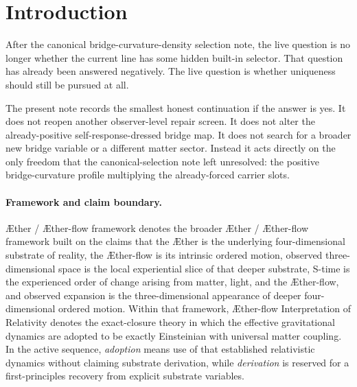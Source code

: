 \documentclass[11pt]{article}
\newcommand{\Aether}{\AE{}ther}
\newcommand{\Aflow}{\AE{}ther-flow}
\newcommand{\TheoryName}{\Aflow{} Interpretation of Relativity}
\newcommand{\TheoryProgram}{\Aether{} / \Aflow{} framework}
\newcommand{\CurvScale}{\ell_{\mathrm{br}}}
\newcommand{\CurvProfileCan}{F_{\mathrm{br}}^{\mathrm{can}}}
\begin{document}
\begin{abstract}
Because the downstream package is already profile-blind, substituting \(\CurvProfileCan\) back into the explicit local bridge-curvature density preserves the same reduced current, Hamiltonian-charge flux, continuity/Gauss-Poisson package, exterior Coulomb tail, surviving dressed bridge map, and explicit \(r^{-2}\) gain package as before. The claim boundary is strict: this note does not derive the new selector from the old local action, does not reopen observer-level repair work, and does not yet derive the response scale \(\CurvScale\) from deeper substrate microphysics. Its result is conditional and narrower: if uniqueness remains part of the derivational goal, then a minimal off-shell profile-selection principle already suffices to select the quadratic bridge-curvature profile as the canonical representative at that fixed scale.
\end{abstract}

\section{Introduction}

After the canonical bridge-curvature-density selection note, the live question is no longer whether the current line has some hidden built-in selector. That question has already been answered negatively. The live question is whether uniqueness should still be pursued at all.

The present note records the smallest honest continuation if the answer is yes. It does not reopen another observer-level repair screen. It does not alter the already-positive self-response-dressed bridge map. It does not search for a broader new bridge variable or a different matter sector. Instead it acts directly on the only freedom that the canonical-selection note left unresolved: the positive bridge-curvature profile multiplying the already-forced carrier slots.

\paragraph{Framework and claim boundary.}
\TheoryProgram{} denotes the broader \Aether{} / \Aflow{} framework built on the claims that the \Aether{} is the underlying four-dimensional substrate of reality, the \Aflow{} is its intrinsic ordered motion, observed three-dimensional space is the local experiential slice of that deeper substrate, S-time is the experienced order of change arising from matter, light, and the \Aflow{}, and observed expansion is the three-dimensional appearance of deeper four-dimensional ordered motion. Within that framework, \TheoryName{} denotes the exact-closure theory in which the effective gravitational dynamics are adopted to be exactly Einsteinian with universal matter coupling. In the active sequence, \emph{adoption} means use of that established relativistic dynamics without claiming substrate derivation, while \emph{derivation} is reserved for a first-principles recovery from explicit substrate variables.
\end{document}
